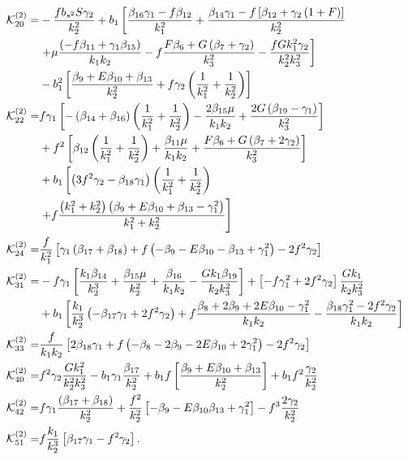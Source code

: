 \begin{align*}
\mathcal{K}_{20}^{(2)}=& - \frac{f b_{s^2} S \gamma_2}{k_2^2}  + b_1 \left[ \frac{\beta_{16} \gamma_1 - f \beta_{12}}{k_1^2} + \frac{\beta_{14} \gamma_1 - f \left[\beta_{12} + \gamma_2\left(1+F\right) \right]}{k_2^2} \right. \\
&\left. + \mu \frac{\left(- f \beta_{11} + \gamma_1 \beta_{15}\right)}{k_1 k_2} - f\frac{F \beta_{6} + G \left(\beta_{7} + \gamma_2 \right)}{k_3^2} - \frac{f G k_1^2 \gamma_2}{k_2^2 k_3^2}\right] \\
&- b_1^2 \left[ \frac{\beta_{9} + E \beta_{10} + \beta_{13}}{k_2^2}  + f \gamma_2 \left(\frac{1}{k_1^2}+\frac{1}{k_2^2} \right)\right] \\
\mathcal{K}_{22}^{(2)}=&  f \gamma_1 \left[ - \left(\beta_{14} + \beta_{16} \right)\left(\frac{1}{k_1^2}+\frac{1}{k_2^2}\right)  - \frac{2 \beta_{15} \mu}{k_1 k_2} + \frac{2 G \left(\beta_{19} - \gamma_1\right)}{k_3^2}\right] \\
&+ f^2 \left[ \beta_{12}\left(\frac{1}{k_1^2}+\frac{1}{k_2^2} \right)+ \frac{\beta_{11} \mu}{k_1 k_2} + \frac{F \beta_{6} + G \left(\beta_{7} + 2 \gamma_2\right)}{k_3^2}  \right] \\
&+ b_1 \left[  \left(3 f^2 \gamma_2 -\beta_{18} \gamma_1 \right) \left(\frac{1}{k_1^2}+\frac{1}{k_2^2} \right) \right. \\
&\left. + f \frac{\left(k_1^2 + k_2^2\right) \left(\beta_{9} + E \beta_{10} + \beta_{13} - \gamma_1^2\right)}{k_1^2 + k_2^2}   \right]\\
\mathcal{K}_{24}^{(2)}=& \frac{f}{k_1^2} \left[ \gamma_1 \left(\beta_{17} + \beta_{18}\right)+ f\left(- \beta_{9} - E \beta_{10} - \beta_{13} + \gamma_1^2\right) - 2 f^2 \gamma_2 \right]\\
\mathcal{K}_{31}^{(2)}=& - f \gamma_1 \left[ \frac{k_1 \beta_{14}}{k_2^3} + \frac{\beta_{15} \mu}{k_2^2} + \frac{\beta_{16}}{k_1 k_2} - \frac{G k_1 \beta_{19}}{k_2 k_3^2} \right] + \left[- f \gamma_1^2 + 2 f^2 \gamma_2 \right] \frac{G k_1}{k_2 k_3^2} \\
&+ b_1 \left[  \frac{k_1}{k_2^3} \left( -\beta_{17} \gamma_1 + 2 f^2 \gamma_2 \right) + f \frac{\beta_{8}  + 2 \beta_{9} + 2 E \beta_{10} - \gamma_1^2 }{k_1 k_2}  - \frac{\beta_{18} \gamma_1^2 - 2 f^2 \gamma_2}{k_1 k_2} \right] \\
\mathcal{K}_{33}^{(2)}=&\frac{f}{k_1 k_2} \left[ 2 \beta_{18} \gamma_1 + f \left( - \beta_{8} - 2 \beta_{9} - 2 E \beta_{10} + 2 \gamma_1^2 \right) - 2 f^2 \gamma_2 \right]\\
\mathcal{K}_{40}^{(2)}=& f^2 \gamma_2 \frac{G k_1^2}{k_2^2 k_3^2} - b_1 \gamma_1 \frac{\beta_{17}}{k_2^2} + b_1 f \left[ \frac{\beta_{9} + E \beta_{10} + \beta_{13}}{k_2^2} \right] + b_1 f^2 \frac{\gamma_2}{k_2^2} \\
\mathcal{K}_{42}^{(2)}=& f \gamma_1 \frac{\left( \beta_{17} + \beta_{18}\right)}{k_2^2} + \frac{f^2}{k_2^2} \left[ -\beta_{9} - E \beta_{10} \beta_{13} + \gamma_1^2 \right] - f^3 \frac{2 \gamma_2}{k_2^2}\\
\mathcal{K}_{51}^{(2)}=& f \frac{k_1}{k_2^3} \left[ \beta_{17} \gamma_1 - f^2 \gamma_2  \right]  .
\end{align*}

